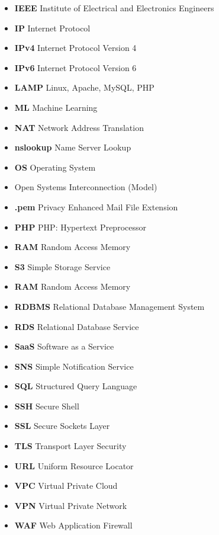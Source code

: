 \begin{itemize}
    \item  \textbf{IEEE} \textemdash Institute of Electrical and Electronics Engineers
    \item  \textbf{IP} \textemdash Internet Protocol
    \item  \textbf{IPv4} \textemdash Internet Protocol Version 4
    \item  \textbf{IPv6} \textemdash Internet Protocol Version 6
    \item  \textbf{LAMP} \textemdash Linux, Apache, MySQL, PHP
    \item  \textbf{ML} \textemdash Machine Learning
    \item  \textbf{NAT} \textemdash Network Address Translation
    \item  \textbf{nslookup} \textemdash Name Server Lookup
    \item  \textbf{OS} \textemdash Operating System
    \item  {} \textemdash Open Systems Interconnection (Model)
    \item  \textbf{.pem} \textemdash Privacy Enhanced Mail File Extension
    \item  \textbf{PHP} \textemdash PHP: Hypertext Preprocessor
    \item  \textbf{RAM} \textemdash Random Access Memory
    \item  \textbf{S3} \textemdash Simple Storage Service
    \item  \textbf{RAM} \textemdash Random Access Memory
    \item  \textbf{RDBMS} \textemdash Relational Database Management System
    \item  \textbf{RDS} \textemdash Relational Database Service
    \item  \textbf{SaaS} \textemdash Software as a Service
    \item  \textbf{SNS} \textemdash Simple Notification Service
    \item  \textbf{SQL} \textemdash Structured Query Language
    \item  \textbf{SSH} \textemdash Secure Shell
    \item  \textbf{SSL} \textemdash Secure Sockets Layer
    \item  \textbf{TLS} \textemdash Transport Layer Security
    \item  \textbf{URL} \textemdash Uniform Resource Locator
    \item  \textbf{VPC} \textemdash Virtual Private Cloud
    \item  \textbf{VPN} \textemdash Virtual Private Network
    \item  \textbf{WAF} \textemdash Web Application Firewall
\end{itemize}